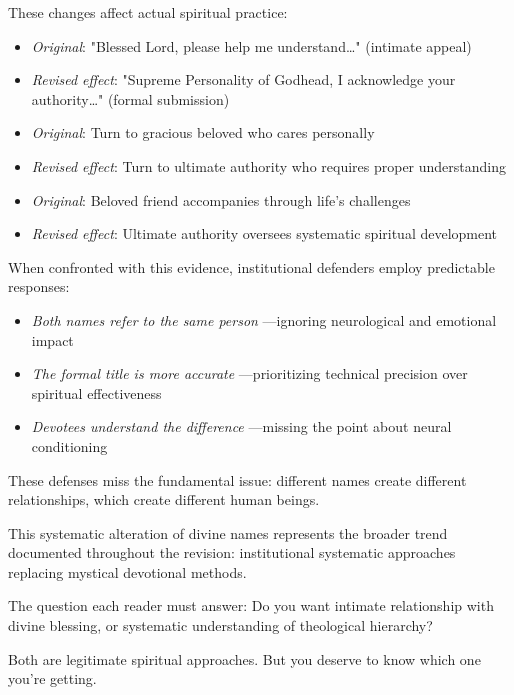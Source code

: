 \documentclass[12pt,twoside]{book}
\begin{document}
These changes affect actual spiritual practice:

\begin{itemize}
\item \emph{Original}: "Blessed Lord, please help me understand\ldots{}" (intimate appeal)
\item \emph{Revised effect}: "Supreme Personality of Godhead, I acknowledge your authority\ldots{}" (formal submission)

\item \emph{Original}: Turn to gracious beloved who cares personally
\item \emph{Revised effect}: Turn to ultimate authority who requires proper understanding

\item \emph{Original}: Beloved friend accompanies through life's challenges
\item \emph{Revised effect}: Ultimate authority oversees systematic spiritual development
\end{itemize}

When confronted with this evidence, institutional defenders employ predictable responses:

\begin{itemize}
\item \emph{Both names refer to the same person} —ignoring neurological and emotional impact
\item \emph{The formal title is more accurate} —prioritizing technical precision over spiritual effectiveness
\item \emph{Devotees understand the difference} —missing the point about neural conditioning
\end{itemize}

These defenses miss the fundamental issue: different names create different relationships, which create different human beings.

This systematic alteration of divine names represents the broader trend documented throughout the revision: institutional systematic approaches replacing mystical devotional methods.

The question each reader must answer: Do you want intimate relationship with divine blessing, or systematic understanding of theological hierarchy?

Both are legitimate spiritual approaches. But you deserve to know which one you're getting.



\vspace{0.1cm}
\end{document}
